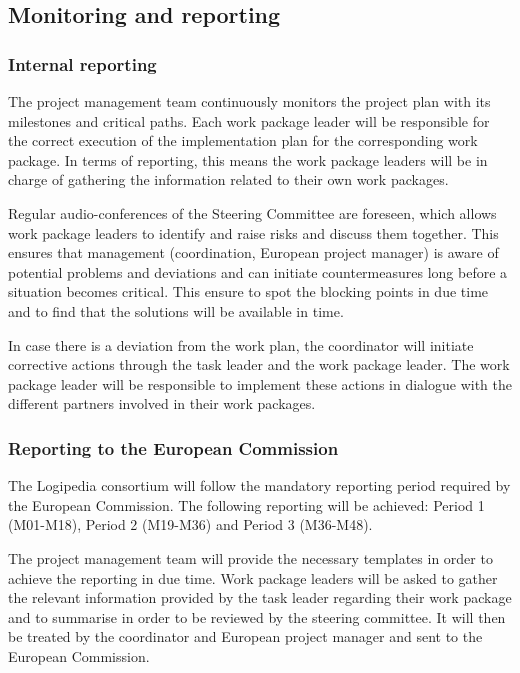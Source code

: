 \subsection{Monitoring and reporting}

\subsubsection*{Internal reporting}

The project management team continuously monitors the project plan
with its milestones and critical paths. Each work package leader will be
responsible for the correct execution of the implementation plan for
the corresponding work package. In terms of reporting, this means the work package leaders
will be in charge of gathering the information related to their own
work packages.

Regular audio-conferences of the Steering Committee are foreseen,
which allows work package leaders to identify and raise risks and
discuss them together. This ensures that management (coordination,
European project manager) is aware of potential problems and
deviations and can initiate countermeasures long before a situation
becomes critical. This ensure to spot the blocking points in due time
and to find that the solutions will be available in time.

In case there is a deviation from the work plan, the 
coordinator will initiate corrective actions through the
task leader and the work package leader. The work package leader will
be responsible to implement these actions in dialogue with the
different partners involved in their work packages.

\subsubsection*{Reporting to the European Commission}

The Logipedia consortium will follow the mandatory reporting period
required by the European Commission. The following reporting will be
achieved: Period 1 (M01-M18), Period 2 (M19-M36) and Period 3
(M36-M48).

The project management team will provide the necessary templates in
order to achieve the reporting in due time. Work package leaders will
be asked to gather the relevant information provided by the task
leader regarding their work package and to summarise in order to be
reviewed by the steering committee. It will then be treated by the
coordinator and European project manager and sent to the
European Commission.

